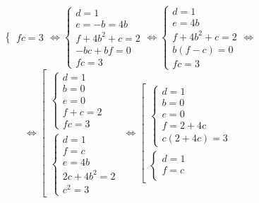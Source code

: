 \begin{solution}
\[\begin{cases}
        fc = 3
    \end{cases} \Longleftrightarrow
    \begin{cases}
        d = 1 \\
        e = -b = 4b \\
        f + 4b^2 + c = 2 \\
        -bc + bf = 0 \\
        fc = 3
    \end{cases} \Longleftrightarrow
    \begin{cases}
        d = 1 \\
        e = 4b \\
        f + 4b^2 + c = 2 \\
        b(f - c) = 0 \\
        fc = 3
    \end{cases} \Longleftrightarrow
    \]
    \[
    \Longleftrightarrow
    \left[
    \begin{array}{l}
        \begin{cases}
            d = 1 \\
            b = 0 \\
            e = 0 \\
            f + c = 2 \\
            fc = 3
        \end{cases} \\
        \begin{cases}
            d = 1 \\
            f = c \\
            e = 4b \\
            2c + 4b^2 = 2 \\
            c^2 = 3
        \end{cases}
    \end{array}
    \right.
    \Longleftrightarrow
    \left[
    \begin{array}{l}
        \begin{cases}
            d = 1 \\
            b = 0 \\
            e = 0 \\
            f = 2 + 4c\\
            c(2 + 4c) = 3
        \end{cases} \\
        \begin{cases}
            d = 1 \\
            f = c \\

\end{cases}
\end{array}\]
\end{solution}
